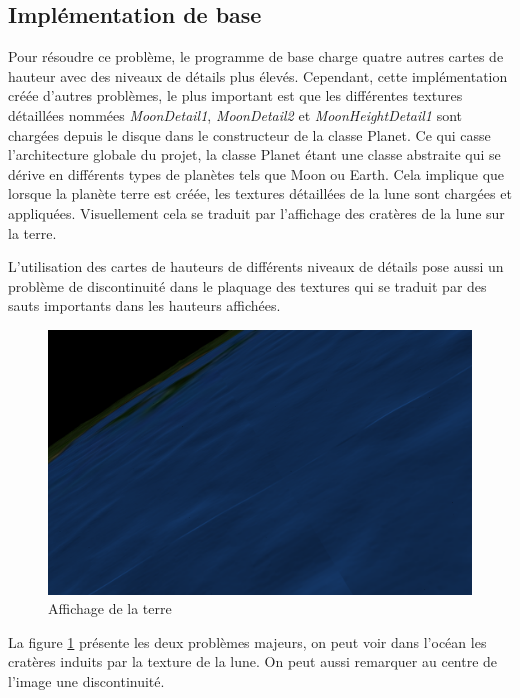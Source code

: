     \subsection{Implémentation de base}
    Pour résoudre ce problème, le programme de base charge quatre autres cartes de hauteur avec des niveaux de détails plus élevés. Cependant, cette implémentation créée d'autres problèmes, le plus important est que les différentes textures détaillées nommées \textit{MoonDetail1}, \textit{MoonDetail2} et \textit{MoonHeightDetail1} sont chargées depuis le disque dans le constructeur de la classe Planet. Ce qui casse l'architecture globale du projet, la classe Planet étant une classe abstraite qui se dérive en différents types de planètes tels que Moon ou Earth.
    Cela implique que lorsque la planète terre est créée, les textures détaillées de la lune sont chargées et appliquées.
    Visuellement cela se traduit par l'affichage des cratères de la lune sur la terre.

    L'utilisation des cartes de hauteurs de différents niveaux de détails pose aussi un problème de discontinuité dans le plaquage des textures qui se traduit par des sauts importants dans les hauteurs affichées.\\
     
    \begin{figure}
        \centering
        \includegraphics[width=12cm]{img/earth.png}
        \caption{Affichage de la terre}
        \label{fig:earth}
    \end{figure}
    
    
    La figure \ref{fig:earth} présente les deux problèmes majeurs, on peut voir dans l'océan les cratères induits par la texture de la lune. On peut aussi remarquer au centre de l'image une discontinuité.\\
    
